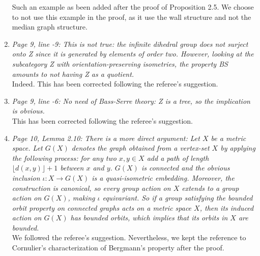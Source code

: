 \documentclass[english,a4paper]{article}
\begin{document}
\begin{enumerate}
Such an example as been added after the proof of Proposition 2.5. We choose to not use this example in the proof, as it use the wall structure and not the median graph structure.
%
\setcounter{enumi}{11}
\item\textit{Page 9, line -9: This is not true: the infinite dihedral group does not surject onto Z since it is generated by elements of order two. However, looking at the subcategory {Z} with orientation-preserving isometries, the property BS amounts to not having Z as a quotient.}\\
Indeed. This has been corrected following the referee's suggestion.
%
\item\textit{Page 9, line -6: No need of Bass-Serre theory: Z is a tree, so the implication is obvious.}\\
This has been corrected following the referee's suggestion.
%
\item\textit{Page 10, Lemma 2.10: There is a more direct argument: Let $X$ be a metric space. Let $G(X)$ denotes the graph obtained from a vertex-set $X$ by applying the following process: for any two $x, y\in X$ add a path of length $\lfloor d(x, y)\rfloor + 1$ between $x$ and $y$. $G(X)$ is connected and the obvious inclusion $\iota\colon X\to G(X)$ is a quasi-isometric embedding. Moreover, the construction is canonical, so every group action on $X$ extends to a group action on $G(X)$, making $\iota$ equivariant. So if a group satisfying the bounded orbit property on connected graphs acts on a metric space $X$, then its induced action on $G(X)$ has bounded orbits, which implies that its orbits in $X$ are bounded.}\\
We followed the referee's suggestion. Nevertheless, we kept the reference to Cornulier's characterization of Bergmann's property after the proof.




\end{enumerate}
\end{document}
